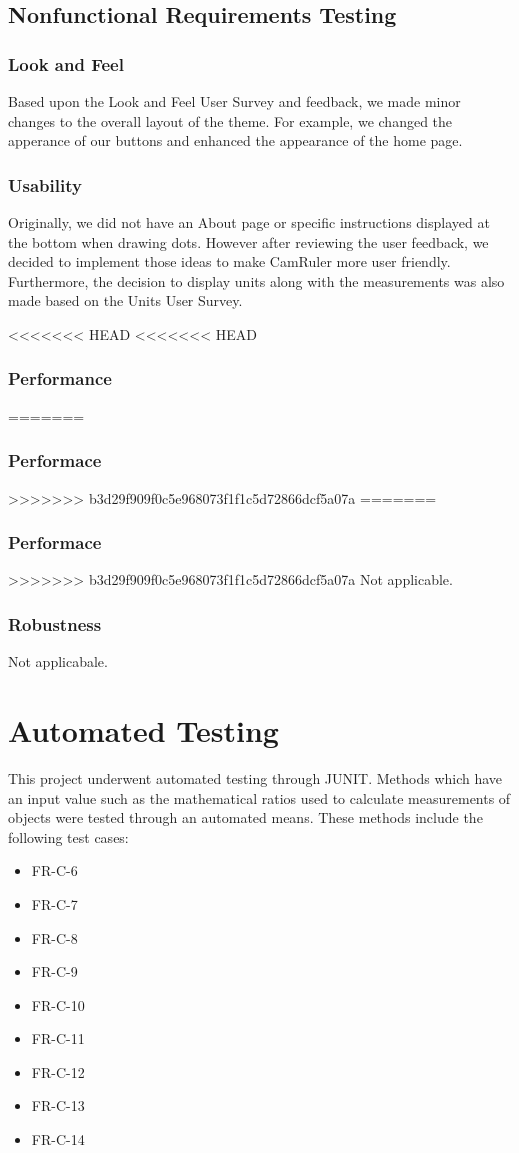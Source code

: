 \documentclass[12pt, titlepage]{article}
\begin{document}
\subsection{Nonfunctional Requirements Testing}
\subsubsection{Look and Feel}
Based upon the Look and Feel User Survey and feedback, we made minor changes to the overall layout of the theme. For example, we changed the apperance of our buttons and enhanced the appearance of the home page.

\subsubsection{Usability}
Originally, we did not have an About page or specific instructions displayed at the bottom when drawing dots. However after reviewing the user feedback, we decided to implement those ideas to make CamRuler more user friendly. Furthermore, the decision to display units along with the measurements was also made based on the Units User Survey. 

<<<<<<< HEAD
<<<<<<< HEAD
\subsubsection{Performance}
=======
\subsubsection{Performace}
>>>>>>> b3d29f909f0c5e968073f1f1c5d72866dcf5a07a
=======
\subsubsection{Performace}
>>>>>>> b3d29f909f0c5e968073f1f1c5d72866dcf5a07a
Not applicable.

\subsubsection{Robustness}
Not applicabale.

\section{Automated Testing}
This project underwent automated testing through JUNIT. Methods which have an input value such as the mathematical ratios used to calculate measurements of objects were tested through an automated means. These methods include the following test cases:
\begin{itemize}
\item{FR-C-6}
\item{FR-C-7}
\item{FR-C-8}
\item{FR-C-9}
\item{FR-C-10}
\item{FR-C-11}
\item{FR-C-12}
\item{FR-C-13}
\item{FR-C-14}
\end{itemize}
\end{document}
